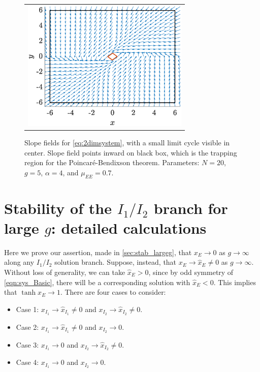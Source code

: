 \documentclass[reqno]{siamonline190516}
\begin{document}
\begin{figure}
    \centering
    \begin{tabular}{c}
    \includegraphics[width=8cm]{trappingregion.eps}
    \end{tabular}
    \caption{Slope fields for \cref{eq:2dimsystem}, with a small limit cycle visible in center. Slope field points inward on black box, which is the trapping region for the Poincar{\'e}-Bendixson theorem. Parameters: $N = 20$, $g = 5$, $\alpha = 4$, and $\mu_{EE} = 0.7$.}
    \label{fig:nullclines}
\end{figure}

\section{Stability of the \texorpdfstring{$I_1/I_2$}{I1/I2} branch for large \texorpdfstring{$g$}{g}: detailed calculations }\label{app:stab_largeg} 

Here we prove our assertion, made in \cref{sec:stab_largeg}, that $x_E \rightarrow 0$ as $g\rightarrow \infty$ along any $I_1/I_2$ solution branch.
Suppose, instead, that $x_E \rightarrow \hat{x}_E \neq 0$ as $g \rightarrow \infty$. Without loss of generality, we can take $\hat{x}_E > 0$, since by odd symmetry of \cref{eqn:sys_Basic}, there will be a corresponding solution with $\hat{x}_E < 0$. This implies that $\tanh x_{E} \rightarrow 1$. There are four cases to consider:\\
\begin{itemize}
    \item Case 1: $x_{I_1} \rightarrow \hat{x}_{I_1} \neq 0$ and $x_{I_2} \rightarrow \hat{x}_{I_2} \neq 0$.
    \item Case 2: $x_{I_1} \rightarrow \hat{x}_{I_1} \neq 0$ and $x_{I_2} \rightarrow 0$.
    \item Case 3: $x_{I_1} \rightarrow 0$ and $x_{I_2} \rightarrow \hat{x}_{I_2} \neq 0$.
    \item Case 4: $x_{I_1} \rightarrow 0$ and $x_{I_2} \rightarrow 0$.\\
\end{itemize}
\end{document}
